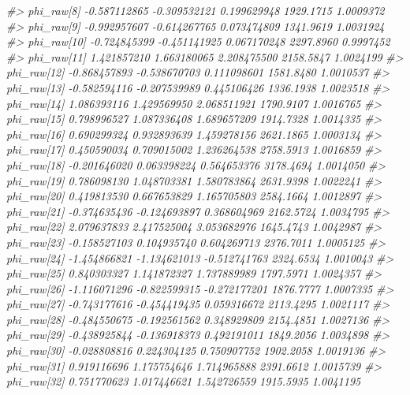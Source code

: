 \documentclass[
]{article}
\newenvironment{Shaded}{\begin{snugshade}}{\end{snugshade}}
\newcommand{\CommentTok}[1]{\textcolor[rgb]{0.56,0.35,0.01}{\textit{#1}}}
\begin{document}
\begin{Shaded}
\begin{Highlighting}[]
\CommentTok{\#\textgreater{} phi\_raw[8]   {-}0.587112865  {-}0.309532121   0.199629948 1929.1715 1.0009372}
\CommentTok{\#\textgreater{} phi\_raw[9]   {-}0.992957607  {-}0.614267765   0.073474809 1341.9619 1.0031924}
\CommentTok{\#\textgreater{} phi\_raw[10]  {-}0.724845399  {-}0.451141925   0.067170248 2297.8960 0.9997452}
\CommentTok{\#\textgreater{} phi\_raw[11]   1.421857210   1.663180065   2.208475500 2158.5847 1.0024199}
\CommentTok{\#\textgreater{} phi\_raw[12]  {-}0.868457893  {-}0.538670703   0.111098601 1581.8480 1.0010537}
\CommentTok{\#\textgreater{} phi\_raw[13]  {-}0.582594116  {-}0.207539989   0.445106426 1336.1938 1.0023518}
\CommentTok{\#\textgreater{} phi\_raw[14]   1.086393116   1.429569950   2.068511921 1790.9107 1.0016765}
\CommentTok{\#\textgreater{} phi\_raw[15]   0.798996527   1.087336408   1.689657209 1914.7328 1.0014335}
\CommentTok{\#\textgreater{} phi\_raw[16]   0.690299324   0.932893639   1.459278156 2621.1865 1.0003134}
\CommentTok{\#\textgreater{} phi\_raw[17]   0.450590034   0.709015002   1.236264538 2758.5913 1.0016859}
\CommentTok{\#\textgreater{} phi\_raw[18]  {-}0.201646020   0.063398224   0.564653376 3178.4694 1.0014050}
\CommentTok{\#\textgreater{} phi\_raw[19]   0.786098130   1.048703381   1.580783864 2631.9398 1.0022241}
\CommentTok{\#\textgreater{} phi\_raw[20]   0.419813530   0.667653829   1.165705803 2584.1664 1.0012897}
\CommentTok{\#\textgreater{} phi\_raw[21]  {-}0.374635436  {-}0.124693897   0.368604969 2162.5724 1.0034795}
\CommentTok{\#\textgreater{} phi\_raw[22]   2.079637833   2.417525004   3.053682976 1645.4743 1.0042987}
\CommentTok{\#\textgreater{} phi\_raw[23]  {-}0.158527103   0.104935740   0.604269713 2376.7011 1.0005125}
\CommentTok{\#\textgreater{} phi\_raw[24]  {-}1.454866821  {-}1.134621013  {-}0.512741763 2324.6534 1.0010043}
\CommentTok{\#\textgreater{} phi\_raw[25]   0.840303327   1.141872327   1.737889989 1797.5971 1.0024357}
\CommentTok{\#\textgreater{} phi\_raw[26]  {-}1.116071296  {-}0.822599315  {-}0.272177201 1876.7777 1.0007335}
\CommentTok{\#\textgreater{} phi\_raw[27]  {-}0.743177616  {-}0.454419435   0.059316672 2113.4295 1.0021117}
\CommentTok{\#\textgreater{} phi\_raw[28]  {-}0.484550675  {-}0.192561562   0.348929809 2154.4851 1.0027136}
\CommentTok{\#\textgreater{} phi\_raw[29]  {-}0.438925844  {-}0.136918373   0.492191011 1849.2056 1.0034898}
\CommentTok{\#\textgreater{} phi\_raw[30]  {-}0.028808816   0.224304125   0.750907752 1902.2058 1.0019136}
\CommentTok{\#\textgreater{} phi\_raw[31]   0.919116696   1.175754646   1.714965888 2391.6612 1.0015739}
\CommentTok{\#\textgreater{} phi\_raw[32]   0.751770623   1.017446621   1.542726559 1915.5935 1.0041195}

\end{Highlighting}
\end{Shaded}
\end{document}
